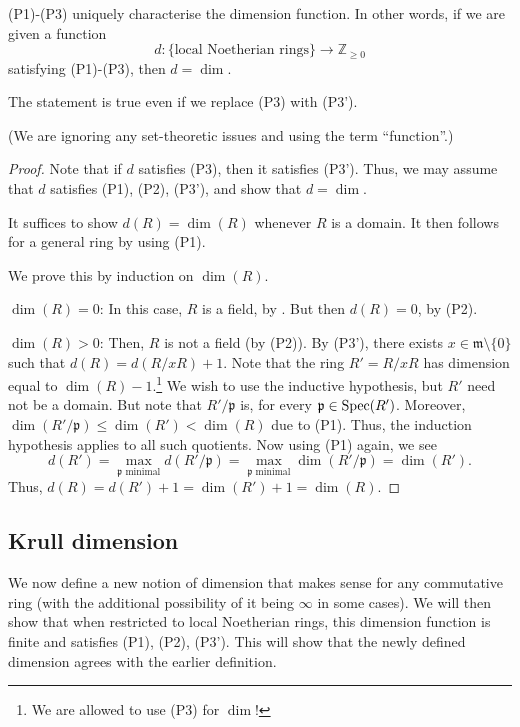 \documentclass[12pt]{article}
\begin{document}
\begin{thm}
	(P1)-(P3) uniquely characterise the dimension function. In other words, if we are given a function 
	\begin{equation*} 
		d : \{\text{local Noetherian rings}\} \to \mathbb{Z}_{\ge 0}
	\end{equation*}
	satisfying (P1)-(P3), then $d = \dim$.

	The statement is true even if we replace (P3) with (P3').
\end{thm}
(We are ignoring any set-theoretic issues and using the term ``function''.)
\begin{proof} 
	Note that if $d$ satisfies (P3), then it satisfies (P3'). Thus, we may assume that $d$ satisfies (P1), (P2), (P3'), and show that $d = \dim$.

	It suffices to show $d(R) = \dim(R)$ whenever $R$ is a domain. It then follows for a general ring by using (P1).

	We prove this by induction on $\dim(R)$. 

	$\dim(R) = 0$: In this case, $R$ is a field, by . But then $d(R) = 0$, by (P2).

	$\dim(R) > 0$: Then, $R$ is not a field (by (P2)). By (P3'), there exists $x \in \mathfrak{m} \setminus \{0\}$ such that $d(R) = d(R/xR) + 1$. \newline
	Note that the ring $R' = R/xR$ has dimension equal to $\dim(R) - 1$.\footnote{We are allowed to use (P3) for $\dim$!} We wish to use the inductive hypothesis, but $R'$ need not be a domain. But note that $R'/\mathfrak{p}$ is, for every $\mathfrak{p} \in \operatorname{Spec}(R')$. \newline
	Moreover, $\dim(R'/\mathfrak{p}) \le \dim(R') < \dim(R)$ due to (P1). Thus, the induction hypothesis applies to all such quotients. Now using (P1) again, we see
	\begin{equation*} 
		d(R') = \max_{\mathfrak{p} \text{ minimal}} d(R'/\mathfrak{p}) = \max_{\mathfrak{p} \text{ minimal}} \dim(R'/\mathfrak{p}) = \dim(R').
	\end{equation*}
	Thus, $d(R) = d(R') + 1 = \dim(R') + 1 = \dim(R)$.
\end{proof}

\subsection{Krull dimension}

We now define a new notion of dimension that makes sense for any commutative ring (with the additional possibility of it being $\infty$ in some cases). We will then show that when restricted to local Noetherian rings, this dimension function is finite and satisfies (P1), (P2), (P3'). This will show that the newly defined dimension agrees with the earlier definition.
\end{document}
